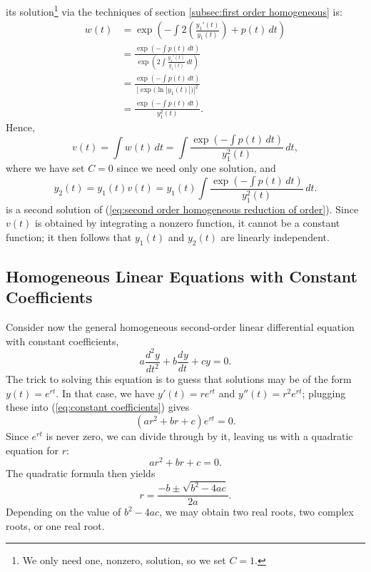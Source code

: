 \documentclass{myart}
\newcommand{\eq}[1]{(\ref{eq:#1})}
\newcommand{\deriv}[3][]{\frac{d^{#1}#2}{d#3^{#1}}}
\begin{document}
its solution\footnote{We only need one, nonzero, solution, so we set
  $C = 1$.} via the techniques of section \ref{subsec:first order
  homogeneous} is:
\begin{align*}
  w(t) &= \exp\left(-\int 2\left(\frac{y_1'(t)}{y_1(t)}\right)
         + p(t) \,dt\right) \\
       &= \frac{\exp\left(-\int p(t) \,dt\right)}
               {\exp\left(2 \int \frac{y_1'(t)}{y_1(t)} \,dt\right)} \\
       &= \frac{\exp\left(-\int p(t) \,dt\right)}
               {\Big[\exp\big(\ln|y_1(t)|\big)\Big]^2} \\
       &= \frac{\exp\left(-\int p(t) \,dt\right)}{y_1^2(t)}.
\end{align*}
Hence,
\begin{equation*}
  v(t) = \int w(t) \,dt = \int \frac{\exp\left(-\int p(t) \,dt\right)}
                                    {y_1^2(t)} \,dt,
\end{equation*}
where we have set $C = 0$ since we need only one solution, and
\begin{equation*}
    y_2(t)
  = y_1(t)v(t)
  = y_1(t) \int \frac{\exp\left(-\int p(t) \,dt\right)}
                     {y_1^2(t)}
                \,dt.
\end{equation*}
is a second solution of \eq{second order homogeneous reduction of
  order}. Since $v(t)$ is obtained by integrating a nonzero function,
it cannot be a constant function; it then follows that $y_1(t)$ and
$y_2(t)$ are linearly independent.

\subsection{Homogeneous Linear Equations with Constant Coefficients}
\label{subsec:constant coefficients}

Consider now the general homogeneous second-order linear differential
equation with constant coefficients,
\begin{equation} \label{eq:constant coefficients}
  a \deriv[2]{y}{t} + b \deriv{y}{t} + cy = 0.
\end{equation}
The trick to solving this equation is to guess that solutions may be
of the form $y(t) = e^{rt}$. In that case, we have $y'(t) = re^{rt}$
and $y''(t) = r^2e^{rt}$; plugging these into \eq{constant
  coefficients} gives
\begin{equation*}
  (ar^2 + br + c)e^{rt} = 0.
\end{equation*}
Since $e^{rt}$ is never zero, we can divide through by it, leaving us
with a quadratic equation for $r$:
\begin{equation*}
  ar^2 + br + c = 0.
\end{equation*}
The quadratic formula then yields
\begin{equation*}
  r = \frac{-b \pm \sqrt{b^2 - 4ac}}{2a}.
\end{equation*}
Depending on the value of $b^2 - 4ac$, we may obtain two real roots,
two complex roots, or one real root.
\end{document}
